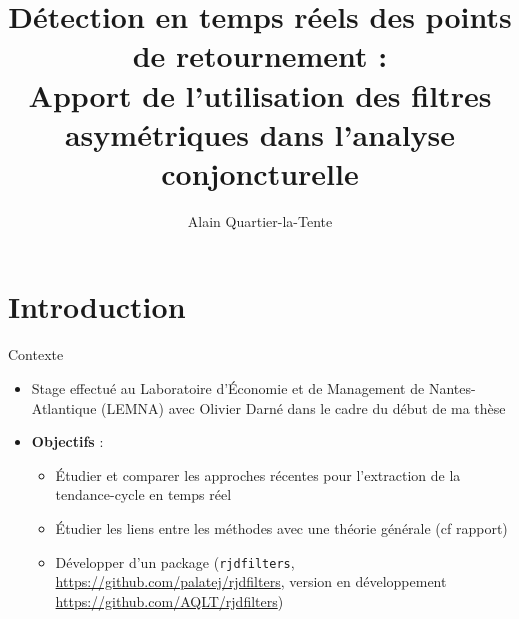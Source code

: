 \documentclass[10pt,xcolor=table,color={dvipsnames,usenames},ignorenonframetext,usepdftitle=false,french]{beamer}
\title{Détection en temps réels des points de retournement :\\
Apport de l'utilisation des filtres asymétriques dans l'analyse
conjoncturelle}
\author{Alain Quartier-la-Tente}
\date{}
\providecommand{\tightlist}{%
  \setlength{\parskip}{0pt}
  }
\newcommand\1{\mathds{1}}
\begin{document}
\begin{frame}
\titlepage
\end{frame}

\hypertarget{introduction}{%
\section{Introduction}\label{introduction}}

\begin{frame}[fragile]{Contexte}
\protect\hypertarget{contexte}{}
\begin{itemize}
\tightlist
\item
  Stage effectué au Laboratoire d'Économie et de Management de
  Nantes-Atlantique (LEMNA) avec Olivier Darné dans le cadre du début de
  ma thèse
\end{itemize}

\bigskip

\pause

\begin{itemize}
\item
  \textbf{Objectifs} :

  \begin{itemize}
  \item
    Étudier et comparer les approches récentes pour l'extraction de la
    tendance-cycle en temps réel
  \item
    Étudier les liens entre les méthodes avec une théorie générale (cf
    rapport)
  \item
    Développer d'un package  (\texttt{rjdfilters},
    \url{https://github.com/palatej/rjdfilters}, version en
    développement \url{https://github.com/AQLT/rjdfilters})
  \end{itemize}
\end{itemize}
\end{frame}
\end{document}

